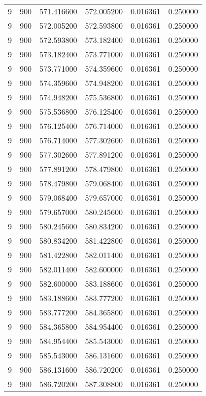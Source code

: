 \begin{longtable}{rrrrrr}
9 & 900 & 571.416600 & 572.005200 & 0.016361 & 0.250000 \\
9 & 900 & 572.005200 & 572.593800 & 0.016361 & 0.250000 \\
9 & 900 & 572.593800 & 573.182400 & 0.016361 & 0.250000 \\
9 & 900 & 573.182400 & 573.771000 & 0.016361 & 0.250000 \\
9 & 900 & 573.771000 & 574.359600 & 0.016361 & 0.250000 \\
9 & 900 & 574.359600 & 574.948200 & 0.016361 & 0.250000 \\
9 & 900 & 574.948200 & 575.536800 & 0.016361 & 0.250000 \\
9 & 900 & 575.536800 & 576.125400 & 0.016361 & 0.250000 \\
9 & 900 & 576.125400 & 576.714000 & 0.016361 & 0.250000 \\
9 & 900 & 576.714000 & 577.302600 & 0.016361 & 0.250000 \\
9 & 900 & 577.302600 & 577.891200 & 0.016361 & 0.250000 \\
9 & 900 & 577.891200 & 578.479800 & 0.016361 & 0.250000 \\
9 & 900 & 578.479800 & 579.068400 & 0.016361 & 0.250000 \\
9 & 900 & 579.068400 & 579.657000 & 0.016361 & 0.250000 \\
9 & 900 & 579.657000 & 580.245600 & 0.016361 & 0.250000 \\
9 & 900 & 580.245600 & 580.834200 & 0.016361 & 0.250000 \\
9 & 900 & 580.834200 & 581.422800 & 0.016361 & 0.250000 \\
9 & 900 & 581.422800 & 582.011400 & 0.016361 & 0.250000 \\
9 & 900 & 582.011400 & 582.600000 & 0.016361 & 0.250000 \\
9 & 900 & 582.600000 & 583.188600 & 0.016361 & 0.250000 \\
9 & 900 & 583.188600 & 583.777200 & 0.016361 & 0.250000 \\
9 & 900 & 583.777200 & 584.365800 & 0.016361 & 0.250000 \\
9 & 900 & 584.365800 & 584.954400 & 0.016361 & 0.250000 \\
9 & 900 & 584.954400 & 585.543000 & 0.016361 & 0.250000 \\
9 & 900 & 585.543000 & 586.131600 & 0.016361 & 0.250000 \\
9 & 900 & 586.131600 & 586.720200 & 0.016361 & 0.250000 \\
9 & 900 & 586.720200 & 587.308800 & 0.016361 & 0.250000 \\

\end{longtable}
